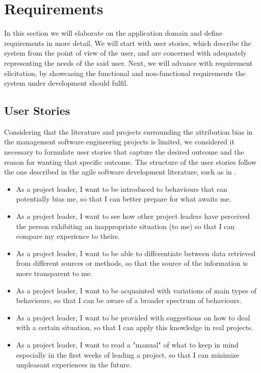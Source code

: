 \section{Requirements} \label{Requirements}

In this section we will elaborate on the application domain and define requirements in more detail. We will start with user stories, which describe the system from the point of view of the user, and are concerned with adequately representing the needs of the said user. Next, we will advance with requirement elicitation, by showcasing the functional and non-functional requirements the system under development should fulfil.

\subsection{User Stories}

Considering that the literature and projects surrounding the attribution bias in the management software engineering projects is limited, we considered it necessary to formulate user stories that capture the desired outcome and the reason for wanting that specific outcome. The structure of the user stories follow the one described in the agile software development literature, such as in \cite{Cohn2004}.

\begin{itemize}
\item As a project leader, I want to be introduced to behaviours that can potentially bias me, so that I can better prepare for what awaits me.

\item As a project leader, I want to see how other project leaders have perceived the person exhibiting an inappropriate situation (to me) so that I can compare my experience to theirs.

\item As a project leader, I want to be able to differentiate between data retrieved from different sources or methods, so that the source of the information is more transparent to me. 

\item As a project leader, I want to be acquainted with variations of main types of behaviours, so that I can be aware of a broader spectrum of behaviours.

\item As a project leader, I want to be provided with suggestions on how to deal with a certain situation, so that I can apply this knowledge in real projects.

\item As a project leader, I want to read a "manual" of what to keep in mind especially in the first weeks of leading a project, so that I can minimize unpleasant experiences in the future.

\end{itemize}

